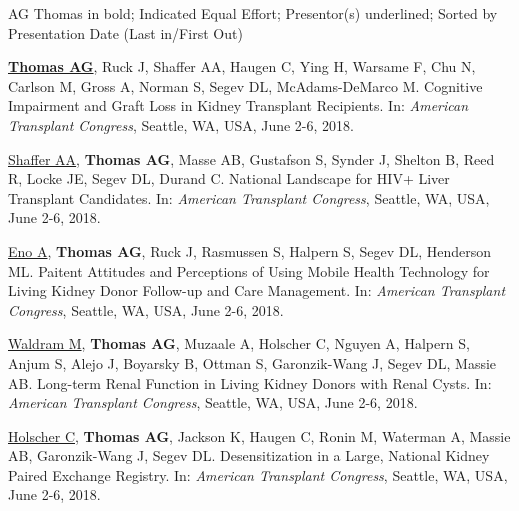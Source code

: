 \documentclass[10pt]{article}
\begin{document}
  AG Thomas in bold; \textbf{\dag} Indicated Equal Effort;
  Presentor(s) underlined; Sorted by Presentation Date (Last in/First Out)

\vspace{2mm}

\begin{bibenum}


\item \underline{\textbf{Thomas AG}}, Ruck J, Shaffer AA, Haugen C,
  Ying H, Warsame F, Chu N, Carlson M, Gross A, Norman S, Segev DL,
  McAdams-DeMarco M.
  Cognitive Impairment and Graft Loss in Kidney Transplant Recipients.
  In: \emph{American Transplant Congress},
  Seattle, WA, USA, June 2-6, 2018.

\item \underline{Shaffer AA}, \textbf{Thomas AG}, Masse AB, Gustafson S,
  Synder J, Shelton B, Reed R, Locke JE, Segev DL, Durand C.
  National Landscape for HIV+ Liver Transplant Candidates.
  In: \emph{American Transplant Congress},
  Seattle, WA, USA, June 2-6, 2018.

\item \underline{Eno A}, \textbf{Thomas AG}, Ruck J, Rasmussen S,
  Halpern S, Segev DL, Henderson ML.
  Paitent Attitudes and Perceptions of Using Mobile Health Technology
  for Living Kidney Donor Follow-up and Care Management.
  In: \emph{American Transplant Congress},
  Seattle, WA, USA, June 2-6, 2018.

\item \underline{Waldram M}, \textbf{Thomas AG}, Muzaale A, Holscher C,
  Nguyen A, Halpern S, Anjum S, Alejo J, Boyarsky B, Ottman S,
  Garonzik-Wang J, Segev DL, Massie AB.
  Long-term Renal Function in Living Kidney Donors with Renal Cysts.
  In: \emph{American Transplant Congress},
  Seattle, WA, USA, June 2-6, 2018.

\item \underline{Holscher C}, \textbf{Thomas AG}, Jackson K, Haugen C,
  Ronin M, Waterman A, Massie AB, Garonzik-Wang J, Segev DL.
  Desensitization in a Large, National Kidney Paired Exchange Registry.
  In: \emph{American Transplant Congress},
  Seattle, WA, USA, June 2-6, 2018.


\end{bibenum}
\end{document}
